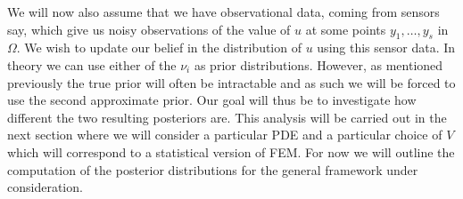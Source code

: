We will now also assume that we have observational data, coming from sensors say, which give us noisy observations of the value of $u$ at some points $y_{1},\dots,y_{s}$ in $\Omega$. We wish to update our belief in the distribution of $u$ using this sensor data. In theory we can use either of the $\nu_{i}$ as prior distributions. However, as mentioned previously the true prior will often be intractable and as such we will be forced to use the second approximate prior. Our goal will thus be to investigate how different the two resulting posteriors are. This analysis will be carried out in the next section where we will consider a particular PDE and a particular choice of $V$ which will correspond to a statistical version of FEM. For now we will outline the computation of the posterior distributions for the general framework under consideration.

